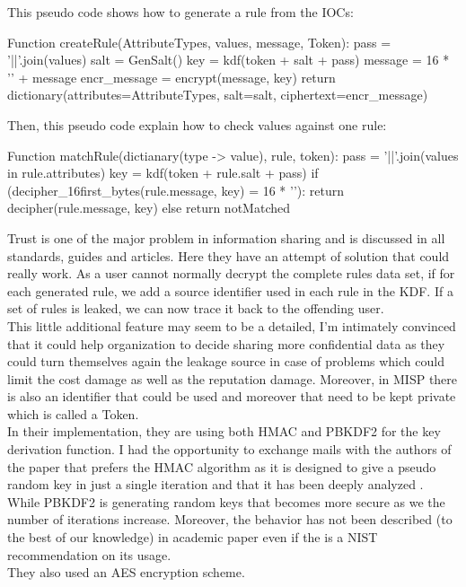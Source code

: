 \documentclass{eplmastersthesis}
\begin{document}
This pseudo code shows how to generate a rule from the IOCs:

\begin{center}
\begin{boxedverbatim}
Function createRule(AttributeTypes, values, message, Token):
        pass = '||'.join(values)
        salt = GenSalt()
        key = kdf(token + salt + pass)
        message = 16 * '' + message
        encr_message = encrypt(message, key)
        return dictionary(attributes=AttributeTypes, 
                            salt=salt,
                            ciphertext=encr_message)
\end{boxedverbatim}
\end{center}

Then, this pseudo code explain how to check values against one rule:
\begin{center}
\begin{boxedverbatim}
Function matchRule(dictianary(type -> value), rule, token):
        pass = '||'.join(values in rule.attributes)
        key = kdf(token + rule.salt + pass)
        if (decipher_16first_bytes(rule.message, key) = 16 * ''):
                return decipher(rule.message, key)
        else
                return notMatched
\end{boxedverbatim}
\end{center}


Trust is one of the major problem in information sharing and is discussed in all standards, guides and articles. Here they have an attempt of solution that could really work. As a user cannot normally decrypt the complete rules data set, if for each generated rule, we add a source identifier used in each rule in the KDF. If a set of rules is leaked, we can now trace it back to the offending user. \\
This little additional feature may seem to be a detailed, I'm intimately convinced that it could help organization to decide sharing more confidential data as they could turn themselves 
again the leakage source in case of problems which could limit the cost damage as well as the reputation damage. Moreover, in MISP there is also an identifier that could be used and moreover that need to be kept private which is called a Token.\\

In their implementation, they are using both HMAC and PBKDF2 for the key derivation function. I had the opportunity to exchange mails with the authors of the paper that prefers the HMAC algorithm as it is designed to give a pseudo random key in just a single iteration and that it has been deeply analyzed \cite{cryptoeprint}. While PBKDF2 is generating random keys that becomes more secure as we the number of iterations increase. Moreover, the behavior has not been described (to the best of our knowledge) in academic paper even if the is a NIST recommendation on its usage.\\
They also used an AES encryption scheme.\\
\end{document}
